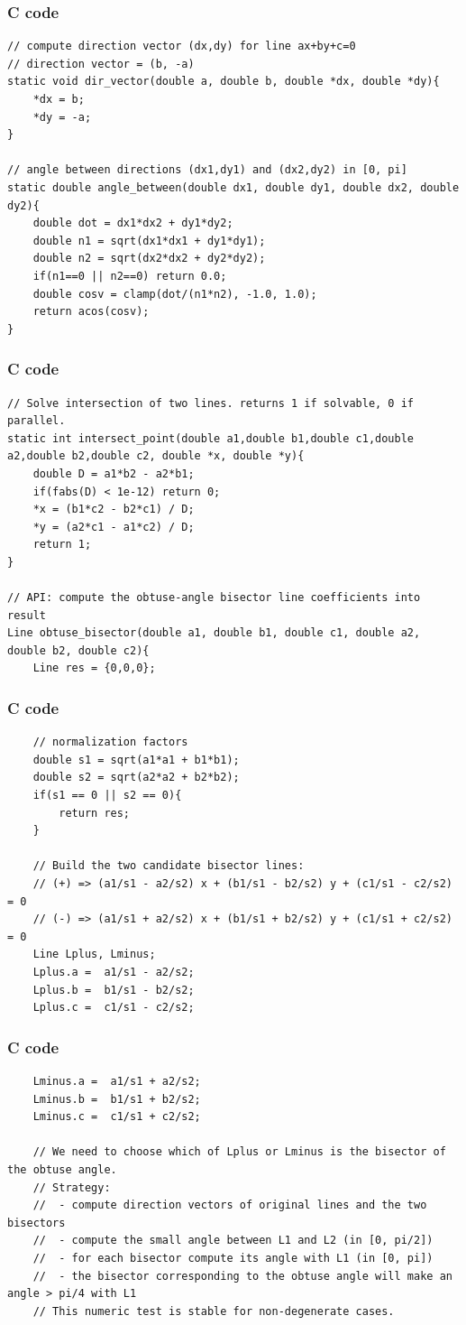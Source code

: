 \documentclass{beamer}
\begin{document}
\begin{frame}[fragile]
\frametitle{C code}
\begin{lstlisting}
// compute direction vector (dx,dy) for line ax+by+c=0
// direction vector = (b, -a)
static void dir_vector(double a, double b, double *dx, double *dy){
    *dx = b;
    *dy = -a;
}

// angle between directions (dx1,dy1) and (dx2,dy2) in [0, pi]
static double angle_between(double dx1, double dy1, double dx2, double dy2){
    double dot = dx1*dx2 + dy1*dy2;
    double n1 = sqrt(dx1*dx1 + dy1*dy1);
    double n2 = sqrt(dx2*dx2 + dy2*dy2);
    if(n1==0 || n2==0) return 0.0;
    double cosv = clamp(dot/(n1*n2), -1.0, 1.0);
    return acos(cosv);
}
\end{lstlisting}
\end{frame}
\begin{frame}[fragile]
\frametitle{C code}
\begin{lstlisting}
// Solve intersection of two lines. returns 1 if solvable, 0 if parallel.
static int intersect_point(double a1,double b1,double c1,double a2,double b2,double c2, double *x, double *y){
    double D = a1*b2 - a2*b1;
    if(fabs(D) < 1e-12) return 0;
    *x = (b1*c2 - b2*c1) / D;
    *y = (a2*c1 - a1*c2) / D;
    return 1;
}

// API: compute the obtuse-angle bisector line coefficients into result
Line obtuse_bisector(double a1, double b1, double c1, double a2, double b2, double c2){
    Line res = {0,0,0};
\end{lstlisting}
\end{frame}
\begin{frame}[fragile]
\frametitle{C code}
\begin{lstlisting}
    // normalization factors
    double s1 = sqrt(a1*a1 + b1*b1);
    double s2 = sqrt(a2*a2 + b2*b2);
    if(s1 == 0 || s2 == 0){
        return res;
    }

    // Build the two candidate bisector lines:
    // (+) => (a1/s1 - a2/s2) x + (b1/s1 - b2/s2) y + (c1/s1 - c2/s2) = 0
    // (-) => (a1/s1 + a2/s2) x + (b1/s1 + b2/s2) y + (c1/s1 + c2/s2) = 0
    Line Lplus, Lminus;
    Lplus.a =  a1/s1 - a2/s2;
    Lplus.b =  b1/s1 - b2/s2;
    Lplus.c =  c1/s1 - c2/s2;
\end{lstlisting}
\end{frame}
\begin{frame}[fragile]
\frametitle{C code}
\begin{lstlisting}
    Lminus.a =  a1/s1 + a2/s2;
    Lminus.b =  b1/s1 + b2/s2;
    Lminus.c =  c1/s1 + c2/s2;

    // We need to choose which of Lplus or Lminus is the bisector of the obtuse angle.
    // Strategy:
    //  - compute direction vectors of original lines and the two bisectors
    //  - compute the small angle between L1 and L2 (in [0, pi/2])
    //  - for each bisector compute its angle with L1 (in [0, pi])
    //  - the bisector corresponding to the obtuse angle will make an angle > pi/4 with L1
    // This numeric test is stable for non-degenerate cases.
\end{lstlisting}
\end{frame}
\end{document}
